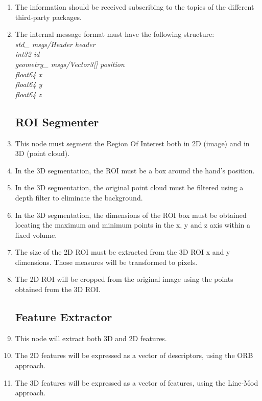 \documentclass{article}
\makeatletter
\def\threedigits#1{\expandafter\@threedigits\csname c@#1\endcsname}
\def\@threedigits#1{%
  \ifnum#1<100 0\fi
  \ifnum#1<10 0\fi
  \number#1}
\makeatother
\begin{document}
\begin{enumerate}[label=\textbf{FR\threedigits*}, leftmargin=2cm]
\item The information should be received subscribing to the topics of the different third-party packages. 
\item The internal message format must have the following structure: \\[0.3cm]
\textit{
std\_ msgs/Header header\\[0.1cm]
int32 id\\[0.1cm]
geometry\_ msgs/Vector3[] position\\
\hspace*{0.5cm}float64 x\\
\hspace*{0.5cm}float64 y\\
\hspace*{0.5cm}float64 z\\
}


\subsection{ROI Segmenter}
	\item This node must segment the Region Of Interest both in 2D (image) and in 3D (point cloud). 
	\item In the 3D segmentation, the ROI must be a box around the hand's position. 
	\item In the 3D segmentation, the original point cloud must be filtered using a depth filter to eliminate the background.
	\item In the 3D segmentation, the dimensions of the ROI box must be obtained locating the maximum and minimum points in the x, y and z axis within a fixed volume. 
	\item The size of the 2D ROI must be extracted from the 3D ROI x and y dimensions. Those measures will be transformed to pixels. 
	\item The 2D ROI will be cropped from the original image using the points obtained from the 3D ROI. 

\subsection{Feature Extractor}
\item This node will extract both 3D and 2D features. 
\item The 2D features will be expressed as a vector of descriptors, using the ORB approach. 
\item The 3D features will be expressed as a vector of features, using the Line-Mod approach.


\end{enumerate}
\end{document}
